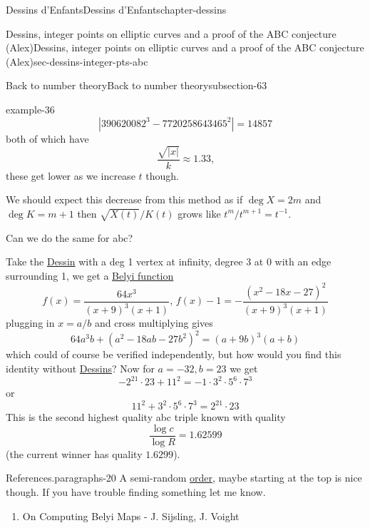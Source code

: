\documentclass[oneside,10pt,]{book}
\numberwithin{equation}{section}
\newcommand{\inv}{^{-1}}
\begin{document}
\begin{chapterptx}{Dessins d'Enfants}{}{Dessins d'Enfants}{}{}{chapter-dessins}
\begin{sectionptx}{Dessins, integer points on elliptic curves and a proof of the ABC conjecture (Alex)}{}{Dessins, integer points on elliptic curves and a proof of the ABC conjecture (Alex)}{}{}{sec-dessins-integer-pts-abc}
\begin{subsectionptx}{Back to number theory}{}{Back to number theory}{}{}{subsection-63}
\begin{example}{}{example-36}
\begin{equation*}
\end{equation*}
%
\begin{equation*}
|390620082^3 - 7720258643465^2| = 14857
\end{equation*}
both of which have%
\begin{equation*}
\frac{\sqrt{|x|}}{k} \approx 1.33\text{,}
\end{equation*}
these get lower as we increase \(t\) though.%
\end{example}
\hypertarget{p-731}{}%
We should expect this decrease from this method as if \(\deg X = 2m\) and \(\deg K = m + 1\) then \(\sqrt{X(t)}/K(t)\) grows like \(t^{m}/t^{m+1} = t\inv\).%
\par
\hypertarget{p-732}{}%
Can we do the same for abc?%
\par
\hypertarget{p-733}{}%
Take the \hyperref[def-dessin-denfant]{Dessin} with a deg 1 vertex at infinity, degree 3 at 0 with an edge surrounding 1, we get a \hyperref[def-belyi-function]{Belyi function}%
\begin{equation*}
f(x) = \frac{64x^3}{(x+9)^3 (x+1)},\,f(x) - 1 = -\frac{(x^2 - 18x -27)^2}{(x+9)^3(x+1)}
\end{equation*}
plugging in \(x=a/b\) and cross multiplying gives%
\begin{equation*}
64a^3 b + (a^2 - 18ab - 27b^2)^2 = (a+9b)^3(a+b)
\end{equation*}
which could of course be verified independently, but how would you find this identity without \hyperref[def-dessin-denfant]{Dessins}? Now for \(a = -32, b= 23\) we get%
\begin{equation*}
- 2^{21} \cdot 23 +  11^2 =  -1 \cdot 3^2 \cdot 5^6 \cdot 7^3
\end{equation*}
or%
\begin{equation*}
11^2 + 3^2 \cdot 5^6 \cdot 7^3 = 2^{21} \cdot 23
\end{equation*}
This is the second highest quality abc triple known with quality%
\begin{equation*}
\frac{\log c}{\log R} = 1.62599
\end{equation*}
(the current winner has quality \(1.6299\)).%
\begin{paragraphs}{References.}{paragraphs-20}%
\hypertarget{p-734}{}%
A semi-random \hyperref[def-order-quaternion]{order}, maybe starting at the top is nice though. If you have trouble finding something let me know.\leavevmode%
\begin{enumerate}
\item\hypertarget{li-150}{}On Computing Belyi Maps - J. Sijsling, J. Voight%

\end{enumerate}
\end{paragraphs}
\end{subsectionptx}
\end{sectionptx}
\end{chapterptx}
\end{document}
